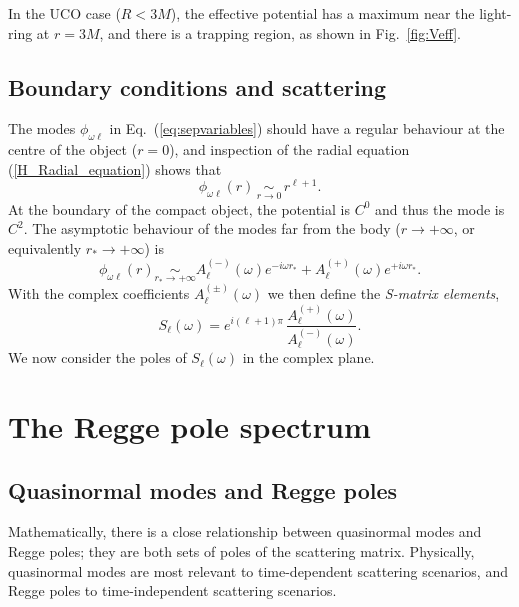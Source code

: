 \documentclass[aps,prd,longbibliography,reprint,twocolumn,amsmath,amssymb,amsfonts,showpacs,superscriptaddress]{revtex4-1}%
\begin{document}
In the UCO case ($R < 3M$), the effective potential has a maximum near the light-ring at $r=3M$, and there is a trapping region, as shown in Fig.~\ref{fig:Veff}.

\subsection{Boundary conditions and scattering}\label{subsec:bc}
The modes $\phi_{\omega \ell}$ in Eq.~(\ref{eq:sepvariables}) should have a regular behaviour at the centre of the object ($r = 0$), and inspection of the radial equation (\ref{H_Radial_equation}) shows that
\begin{equation}\label{bc_1_in}
\phi_{\omega  \ell}(r) \, \scriptstyle{\underset{r \to 0}{\sim}} \,
\displaystyle{r^{\ell+1}}.
\end{equation}
At the boundary of the compact object, the potential is $C^0$ and thus the mode is $C^2$. 
The asymptotic behaviour of the modes far from the body ($r \to +\infty$, or equivalently $r_\ast \to +\infty$) is
\begin{equation}\label{bc_2_in}
\phi_{\omega  \ell}(r) \scriptstyle{\underset{r_\ast \to +\infty}{\sim}}
\displaystyle{ A^{(-)}_\ell (\omega) e^{-i\omega r_\ast} + A^{(+)}_\ell (\omega) e^{+i\omega r_\ast}}.
\end{equation}
With the complex coefficients $A^{(\pm)}_\ell (\omega)$ we then define the \emph{S-matrix elements},
\begin{equation}\label{Matrix_S}
  S_{\ell}(\omega) =  e^{i(\ell+1)\pi} \, \frac{A_{\ell}^{(+)}(\omega)}{A_{\ell}^{(-)}(\omega)}.
\end{equation}
We now consider the poles of $S_{\ell}(\omega)$ in the complex plane.


\section{The Regge pole spectrum}

 \subsection{Quasinormal modes and Regge poles}
 Mathematically, there is a close relationship between quasinormal modes and Regge poles; they are both sets of poles of the scattering matrix. Physically, quasinormal modes are most relevant to time-dependent scattering scenarios, and Regge poles to time-independent scattering scenarios.
 
\end{document}

